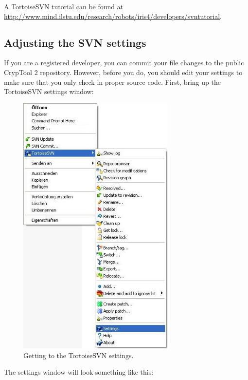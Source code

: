 A TortoiseSVN tutorial can be found at \url{http://www.mind.ilstu.edu/research/robots/iris4/developers/svntutorial}.
\clearpage

\subsection{Adjusting the SVN settings}
\label{AdjustingTheSVNSettings}

If you are a registered developer, you can commit your file changes to the public CrypTool 2 repository. However, before you do, you should edit your settings to make sure that you only check in proper source code. First, bring up the TortoiseSVN settings window:

\begin{figure}[h!]
	\centering
		\includegraphics[width=0.70\textwidth]{figures/tortoise_svn_accessing_settings.jpg}
	\caption{Getting to the TortoiseSVN settings.}
	\label{fig:tortoise_svn_accessing_settings}
\end{figure}
\clearpage

\noindent The settings window will look something like this:

